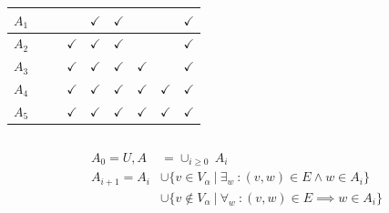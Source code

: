 \documentclass[aspectratio=169]{beamer}
\begin{document}
\begin{frame}[t]
\begin{columns}[T]
\begin{column}{0.5\textwidth}
{\begin{tabular}{|c|c|c|c|c|c|c|c|c|}
		$A_1$ & & & & $\checkmark$ & $\checkmark$& & &$\checkmark$\\ \hline
		$A_2$ & & & $\checkmark$& $\checkmark$ & $\checkmark$& & &$\checkmark$\\ \hline
		$A_3$ & & & $\checkmark$& $\checkmark$ & $\checkmark$& $\checkmark$& &$\checkmark$\\ \hline
		$A_4$ & & & $\checkmark$& $\checkmark$ & $\checkmark$& $\checkmark$&$\checkmark$ &$\checkmark$\\ \hline
		$A_5$ & & & $\checkmark$& $\checkmark$ & $\checkmark$& $\checkmark$& $\checkmark$&$\checkmark$\\ \hline
	\end{tabular}	
}
	\end{column}
\end{columns}
	\begin{align*}
	A_0 = U,A& = \cup_{i\geq 0}\ A_i\\
	A_{i+1} = A_i &\cup \{v \in V_\alpha\ |\ \exists_w\ : (v,w) \in E \wedge w \in A_i \} \\
	 &\cup \{v \notin V_\alpha\ |\ \forall_w\ : (v,w) \in E \implies w \in A_i \}\\
	\end{align*}
\end{frame}

\end{document}
